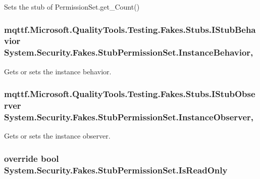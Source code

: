 Sets the stub of Permission\-Set.\-get\-\_\-\-Count()

\hypertarget{class_system_1_1_security_1_1_fakes_1_1_stub_permission_set_a102a16a1e9ff98056ac907f240643241}{
\subsubsection[{Instance\-Behavior}]{\setlength{\rightskip}{0pt plus 5cm}mqttf.\-Microsoft.\-Quality\-Tools.\-Testing.\-Fakes.\-Stubs.\-I\-Stub\-Behavior System.\-Security.\-Fakes.\-Stub\-Permission\-Set.\-Instance\-Behavior\hspace{0.3cm}{\ttfamily [get]}, {\ttfamily [set]}}}\label{class_system_1_1_security_1_1_fakes_1_1_stub_permission_set_a102a16a1e9ff98056ac907f240643241}


Gets or sets the instance behavior.

\hypertarget{class_system_1_1_security_1_1_fakes_1_1_stub_permission_set_a9a7e7122a8779c4157d4616648b33048}{
\subsubsection[{Instance\-Observer}]{\setlength{\rightskip}{0pt plus 5cm}mqttf.\-Microsoft.\-Quality\-Tools.\-Testing.\-Fakes.\-Stubs.\-I\-Stub\-Observer System.\-Security.\-Fakes.\-Stub\-Permission\-Set.\-Instance\-Observer\hspace{0.3cm}{\ttfamily [get]}, {\ttfamily [set]}}}\label{class_system_1_1_security_1_1_fakes_1_1_stub_permission_set_a9a7e7122a8779c4157d4616648b33048}


Gets or sets the instance observer.

\hypertarget{class_system_1_1_security_1_1_fakes_1_1_stub_permission_set_aa50c34f8d4ca0a4e389f0f38182d73d6}{
\subsubsection[{Is\-Read\-Only}]{\setlength{\rightskip}{0pt plus 5cm}override bool System.\-Security.\-Fakes.\-Stub\-Permission\-Set.\-Is\-Read\-Only\hspace{0.3cm}{\ttfamily [get]}}}\label{class_system_1_1_security_1_1_fakes_1_1_stub_permission_set_aa50c34f8d4ca0a4e389f0f38182d73d6}


